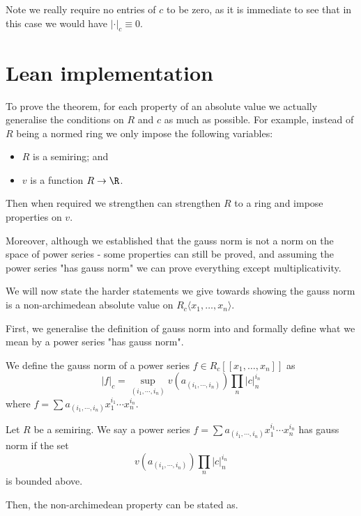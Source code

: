 Note we really require no entries of $c$ to be zero, as it is immediate to see that in this case we
would have $\lvert \cdot \rvert_c \equiv 0$.

\section{Lean implementation}

To prove the theorem, for each property of an absolute value we actually generalise the conditions
on $R$ and $c$ as much as possible. For example, instead of $R$ being a normed ring we only impose the
following variables:

\begin{itemize}
  \item $R$ is a semiring; and
  \item $v$ is a function $R \to \R$.
\end{itemize}

Then when required we strengthen can strengthen $R$ to a ring and impose properties on $v$.

Moreover, although we established that the gauss norm is not a norm on the space of power series -
some properties can still be proved, and assuming the power series "has gauss norm" we can prove
everything except multiplicativity.

We will now state the harder statements we give towards showing the gauss norm is a
non-archimedean absolute value on $R_c \langle x_1, \dots, x_n \rangle$.

First, we generalise the definition of gauss norm into and formally define what we mean by a power
series "has gauss norm".

\begin{definition}
  We define the gauss norm of a power series $f \in R_c [ \! [ x_1, \dots, x_n ] \! ]$ as
  \[
    \lvert f \rvert_c = \sup_{(i_1, \cdots, i_n)} v (a_{(i_1, \cdots, i_n)})  \prod_n \lvert c \rvert _n^{i_n}
  \]
  where $f = \sum a_{(i_1, \cdots, i_n)} x_1^{i_1} \cdots x_n^{i_n}$.
\end{definition}

\begin{definition}
  Let $R$ be a semiring. We say a power series $f = \sum a_{(i_1, \cdots, i_n)} x_1^{i_1} \cdots x_n^{i_n}$
  has gauss norm if the set
  \[
    v (a_{(i_1, \cdots, i_n)})  \prod_n \lvert c \rvert _n^{i_n}
  \]
  is bounded above.
\end{definition}

Then, the non-archimedean property can be stated as.

